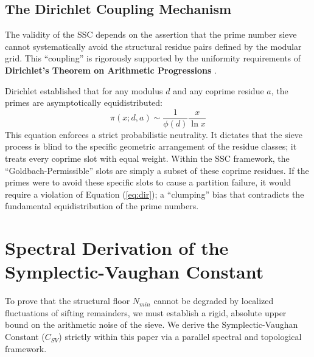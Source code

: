 \documentclass[twoside,9pt]{extarticle}
\begin{document}
\subsection{The Dirichlet Coupling Mechanism} 
\label{subsec:dirichlet}

The validity of the SSC depends on the assertion that the prime number sieve cannot systematically avoid the structural residue pairs defined by the modular grid. This ``coupling'' is rigorously supported by the uniformity requirements of \textbf{Dirichlet's Theorem on Arithmetic Progressions} \cite{dirichlet}.

Dirichlet established that for any modulus $d$ and any coprime residue $a$, the primes are asymptotically equidistributed:
\begin{equation}
\label{eq:dir}
\pi(x; d, a) \sim \frac{1}{\phi(d)} \frac{x}{\ln x}
\end{equation}
This equation enforces a strict probabilistic neutrality. It dictates that the sieve process is blind to the specific geometric arrangement of the residue classes; it treats every coprime slot with equal weight. Within the SSC framework, the ``Goldbach-Permissible'' slots are simply a subset of these coprime residues. If the primes were to avoid these specific slots to cause a partition failure, it would require a violation of Equation (\ref{eq:dir}); a ``clumping'' bias that contradicts the fundamental equidistribution of the prime numbers. 

\section{Spectral Derivation of the Symplectic-Vaughan Constant}
\label{sec:csv_derivation}

To prove that the structural floor $N_{min}$ cannot be degraded by localized fluctuations of sifting remainders, we must establish a rigid, absolute upper bound on the arithmetic noise of the sieve. We derive the Symplectic-Vaughan Constant ($C_{SV}$) strictly within this paper via a parallel spectral and topological framework.
\end{document}
